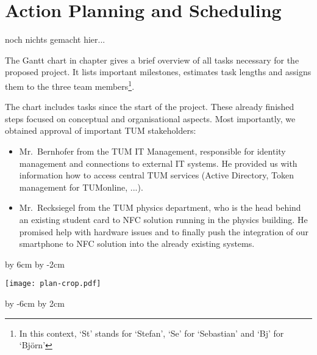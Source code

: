 \section{Action Planning and Scheduling}\label{sec:plan}




noch nichts gemacht hier...


The Gantt chart in chapter gives a brief overview of all tasks necessary for the proposed project.
It lists important milestones, estimates task lengths and assigns them to the three team members\footnote{In this context, `St' stands for `Stefan', `Se' for `Sebastian' and `Bj' for `Björn'}.

The chart includes tasks since the start of the project.
These already finished steps focused on conceptual and organisational aspects.
Most importantly, we obtained approval of important TUM stakeholders:
\begin{itemize}
\item Mr.~Bernhofer from the TUM IT Management, responsible for identity management and connections to external IT systems. He provided us with information how to access central TUM services (Active Directory, Token management for TUMonline, ...).
\item Mr.~Recksiegel from the TUM physics department, who is the head behind an existing student card to NFC solution running in the physics building. He promised help with hardware issues and to finally push the integration of our smartphone to NFC solution into the already existing systems.
\end{itemize}










\par\vfill\break %

\advance\vsize by 6cm %
\advance\voffset by -2cm %
\centerline{\texttt{[image: plan-crop.pdf]}}
\par\vfill\break %

\advance\vsize by -6cm %
\advance\voffset by 2cm %